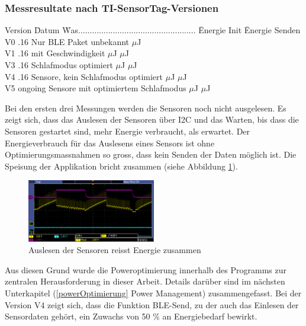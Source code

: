 \subsubsection*{Messresultate nach TI-SensorTag-Versionen}
\begin{tabbing}
    Version   \quad\= Datum    \quad\= Was................................................... \quad\= Energie Init    \quad\=  Energie Senden \\[0.8ex]
    V0        .16  \> Nur BLE Paket      \> unbekannt             $\mu$J \\
    V1        .16  \> mit Geschwindigkeit       $\mu$J             $\mu$J \\
    V3        .16   \> Schlafmodus optimiert      $\mu$J             $\mu$J \\
    V4        .16     Sensore, kein Schlafmodus optimiert      $\mu$J             $\mu$J \\
    V5        \> ongoing     Sensore mit optimiertem Schlafmodus      $\mu$J             $\mu$J \\
\end{tabbing}

Bei den ersten drei Messungen werden die Sensoren noch nicht ausgelesen. Es zeigt sich, dass das Auslesen der Sensoren über I2C und das Warten, bis dass die Sensoren gestartet sind,  mehr Energie verbraucht, als erwartet. Der Energieverbrauch für das Auslesens eines Sensors ist ohne Optimierungsmassnahmen so gross, dass kein Senden der Daten möglich ist. Die Speisung der Applikation bricht zusammen (siehe Abbildung \ref{i2c_problem}).

\begin{figure}[ht]
    \includegraphics[width=0.5\textwidth]{3Vorgehen/imag/pic4VSUPbrichtEin.PNG} 
    \caption{Auslesen der Sensoren reisst Energie zusammen}
    \label{i2c_problem}
\end{figure}


Aus diesen Grund wurde die Poweroptimierung innerhalb des Programms zur zentralen Herausforderung in dieser Arbeit. Details darüber sind im nächsten Unterkapitel (\ref{powerOptimierung} Power Management) zusammengefasst. Bei der Version V4 zeigt sich, dass die Funktion BLE-Send, zu der auch das Einlesen der Sensordaten gehört, ein Zuwachs von 50 \% an Energiebedarf bewirkt. 




